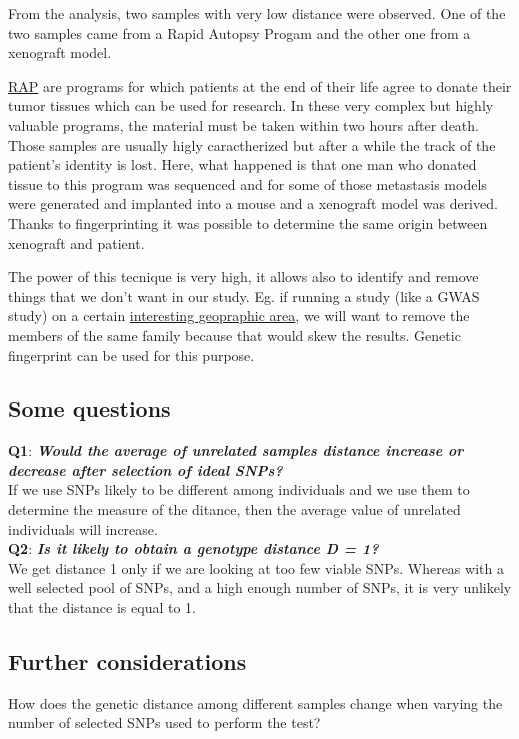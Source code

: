 From the analysis, two samples with very low distance were observed. One of the
two samples came from a Rapid Autopsy Progam and the other one from a xenograft
model. 

\underline{RAP} are programs for which patients at the end of their life agree
to donate their tumor tissues which can be used for research. In these very
complex but highly valuable programs, the material must be taken within two
hours after death. Those samples are usually higly caractherized but after a
while the track of the patient's identity is lost. Here, what happened is that
one man who donated tissue to this program was sequenced and for some of those
metastasis models were generated and implanted into a mouse and a xenograft
model was derived. Thanks to fingerprinting it was possible to determine the
same origin between xenograft and patient. 

The power of this tecnique is very high, it allows also to identify and remove
things that we don't want in our study. Eg. if running a study (like a GWAS
study) on a certain \underline{interesting geopraphic area}, we will want to
remove the members of the same family because that would skew the results.
Genetic fingerprint can be used for this purpose.

\subsection{Some questions}

\noindent\textbf{Q1}: \textbf{\textit{Would the average of unrelated samples
distance increase or decrease after selection of ideal SNPs?}}\\

If we use SNPs likely to be different among individuals and we use them to
determine the measure of the ditance, then the average value of unrelated
individuals will increase.\\

\noindent\textbf{Q2}: \textbf{\textit{Is it likely to obtain a genotype distance
D = 1?}}\\

We get distance 1 only if we are looking at too few viable SNPs. Whereas with a
well selected pool of SNPs, and a high enough number of SNPs, it is very
unlikely that the distance is equal to 1.

\subsection{Further considerations}
How does the genetic distance among different samples change when varying the
number of selected SNPs used to perform the test?

